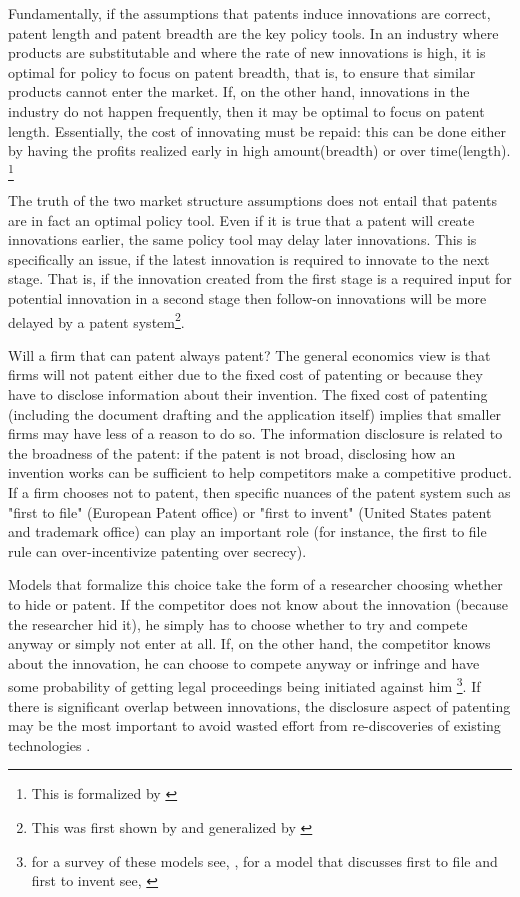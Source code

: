 Fundamentally, if the assumptions that patents induce innovations are correct, patent length and patent breadth are the key policy tools. In an industry where products are substitutable and where the rate of new innovations is high, it is optimal for policy to focus on patent breadth, that is, to ensure that similar products cannot enter the market. If, on the other hand, innovations in the industry do not happen frequently, then it may be optimal to focus on patent length. Essentially, the cost of innovating must be repaid: this can be done either by having the profits realized early in high amount(breadth) or over time(length). \footnote{This is formalized by \cite{takalo2001optimal}}

The truth of the two market structure assumptions does not entail that patents are in fact an optimal policy tool. Even if it is true that a patent will create innovations earlier, the same policy tool may delay later innovations. This is specifically an issue, if the latest innovation is required to innovate to the next stage. That is, if the innovation created from the first stage is a required input for potential innovation in a second stage then follow-on innovations will be more delayed by a patent system\footnote{This was first shown by \cite{bessen_maskin} and generalized by \cite{Bryan2017}}.

Will a firm that can patent always patent? The general economics view is that firms will not patent either due to the fixed cost of patenting or because they have to disclose information about their invention. The fixed cost of patenting (including the document drafting and the application itself) implies that smaller firms may have less of a reason to do so. The information disclosure is related to the broadness of the patent: if the patent is not broad, disclosing how an invention works can be sufficient to help competitors make a competitive product. If a firm chooses not to patent, then specific nuances of the patent system such as "first to file" (European Patent office) or "first to invent" (United States patent and trademark office) can play an important role (for instance, the first to file rule can over-incentivize patenting over secrecy).

Models that formalize this choice take the form of a researcher choosing whether to hide or patent. If the competitor does not know about the innovation (because the researcher hid it), he simply has to choose whether to try and compete anyway or simply not enter at all. If, on the other hand, the competitor knows about the innovation, he can choose to compete anyway or infringe and have some probability of getting legal proceedings being initiated against him \footnote{for a survey of these models see, \cite{Hall2014}, for a model that discusses first to file and first to invent see, \cite{Scotchmer1990} }. If there is significant overlap between innovations, the disclosure aspect of patenting may be the most important to avoid wasted effort from re-discoveries of existing technologies \citep{Kultti2007}.  

